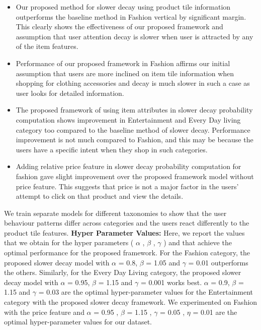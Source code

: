 \documentclass[11pt]{article}
\begin{document}
\begin{itemize}
    \item Our proposed method for slower decay using product tile information outperforms the baseline method in Fashion vertical by significant margin. This clearly shows the effectiveness of our proposed framework and assumption that user attention decay is slower when user is attracted by any of the item features. 
    \item Performance of our proposed framework in Fashion affirms our initial assumption that users are more inclined on item tile information when shopping for clothing accessories and decay is much slower in such a case as user looks for detailed information. 
    \item The proposed framework of using item attributes in slower decay probability computation shows improvement in Entertainment and Every Day living category too compared to the baseline method of slower decay. Performance improvement is not much compared to Fashion, and this may be because the users have a specific intent when they shop in such categories. 
    \item Adding relative price feature in slower decay probability computation for fashion gave slight improvement over the proposed framework model without price feature.  This suggests that price is not a major factor in the users' attempt to click on that product and view the details. 
\end{itemize}
We train separate models for different taxonomies to show that the user behaviour patterns differ across categories and the users react differently to the product tile features. 
\newline
\newline
\textbf{Hyper Parameter Values:} 
Here, we report the values that we obtain for the hyper parameters ( $\alpha$ , $\beta$ , $\gamma$ ) and that achieve the optimal performance for the proposed framework.  For the Fashion category, the proposed slower decay model with $\alpha$ = 0.8, $\beta$ = 1.05 and $\gamma$ = 0.01 outperforms the others. Similarly, for the Every Day Living category, the proposed slower decay model with $\alpha$ = 0.95, $\beta$ = 1.15 and $\gamma$ = 0.001 works best. $\alpha$ = 0.9, $\beta$ = 1.15 and $\gamma$ = 0.03 are the optimal hyper-parameter values for the Entertainment category with the proposed slower decay framework. 
We experimented on Fashion with the price feature and $\alpha$ = 0.95 , $\beta$ = 1.15 , $\gamma$ = 0.05 , $\eta$ = 0.01 are the optimal hyper-parameter values for our dataset. 
\end{document}
